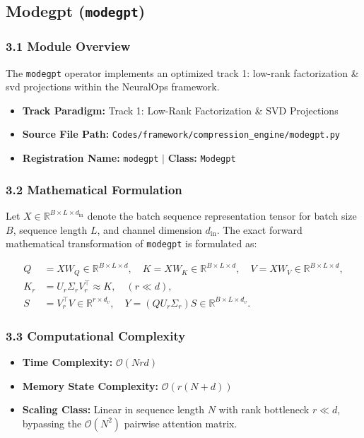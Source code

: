 \subsection{Modegpt (\texttt{modegpt})}
\label{sec:app_module_modegpt}

\subsubsection*{3.1 Module Overview}
The \texttt{modegpt} operator implements an optimized track 1: low-rank factorization \& svd projections within the NeuralOps framework.
\begin{itemize}
    \item \textbf{Track Paradigm:} Track 1: Low-Rank Factorization & SVD Projections
    \item \textbf{Source File Path:} \texttt{Codes/framework/compression\_engine/modegpt.py}
    \item \textbf{Registration Name:} \texttt{modegpt} $\mid$ \textbf{Class:} \texttt{Modegpt}
\end{itemize}

\subsubsection*{3.2 Mathematical Formulation}
Let $X \in \mathbb{R}^{B \times L \times d_{\text{in}}}$ denote the batch sequence representation tensor for batch size $B$, sequence length $L$, and channel dimension $d_{\text{in}}$. The exact forward mathematical transformation of \texttt{modegpt} is formulated as:

\begin{align}
Q &= X W_Q \in \mathbb{R}^{B \times L \times d}, \quad K = X W_K \in \mathbb{R}^{B \times L \times d}, \quad V = X W_V \in \mathbb{R}^{B \times L \times d}, \\
K_r &= U_r \Sigma_r V_r^\top \approx K, \quad (r \ll d), \\
S &= V_r^\top V \in \mathbb{R}^{r \times d_v}, \quad Y = (Q U_r \Sigma_r) S \in \mathbb{R}^{B \times L \times d_v}.
\end{align}


\subsubsection*{3.3 Computational Complexity}
\begin{itemize}
    \item \textbf{Time Complexity:} $\mathcal{O}(N r d)$
    \item \textbf{Memory State Complexity:} $\mathcal{O}(r(N + d))$
    \item \textbf{Scaling Class:} Linear in sequence length $N$ with rank bottleneck $r \ll d$, bypassing the $\mathcal{O}(N^2)$ pairwise attention matrix.
\end{itemize}

